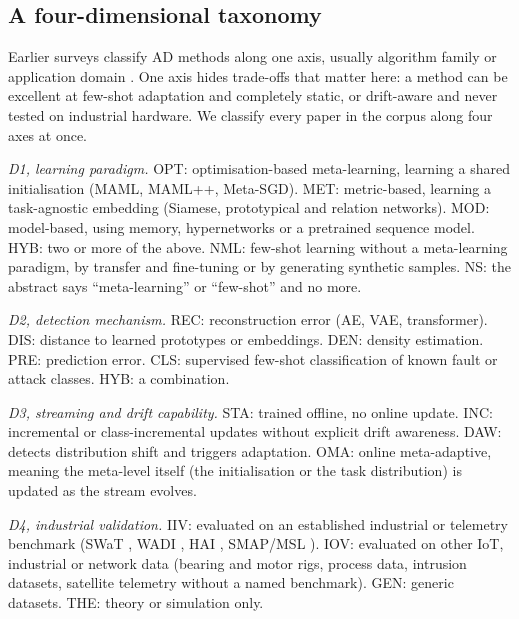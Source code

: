 \hypertarget{a-four-dimensional-taxonomy}{%
\subsection{A four-dimensional taxonomy}\label{a-four-dimensional-taxonomy}}

Earlier surveys classify AD methods along one axis, usually algorithm family \citep{chandola2009survey, pang2021deep} or application domain \citep{belay2023iot}. One axis hides trade-offs that matter here: a method can be excellent at few-shot adaptation and completely static, or drift-aware and never tested on industrial hardware. We classify every paper in the corpus along four axes at once.

\emph{D1, learning paradigm.} OPT: optimisation-based meta-learning, learning a shared initialisation (MAML, MAML++, Meta-SGD). MET: metric-based, learning a task-agnostic embedding (Siamese, prototypical and relation networks). MOD: model-based, using memory, hypernetworks or a pretrained sequence model. HYB: two or more of the above. NML: few-shot learning without a meta-learning paradigm, by transfer and fine-tuning or by generating synthetic samples. NS: the abstract says ``meta-learning'' or ``few-shot'' and no more.

\emph{D2, detection mechanism.} REC: reconstruction error (AE, VAE, transformer). DIS: distance to learned prototypes or embeddings. DEN: density estimation. PRE: prediction error. CLS: supervised few-shot classification of known fault or attack classes. HYB: a combination.

\emph{D3, streaming and drift capability.} STA: trained offline, no online update. INC: incremental or class-incremental updates without explicit drift awareness. DAW: detects distribution shift and triggers adaptation. OMA: online meta-adaptive, meaning the meta-level itself (the initialisation or the task distribution) is updated as the stream evolves.

\emph{D4, industrial validation.} IIV: evaluated on an established industrial or telemetry benchmark (SWaT \citep{goh2016swat}, WADI \citep{ahmed2017wadi}, HAI \citep{shin2021hai}, SMAP/MSL \citep{hundman2018smap}). IOV: evaluated on other IoT, industrial or network data (bearing and motor rigs, process data, intrusion datasets, satellite telemetry without a named benchmark). GEN: generic datasets. THE: theory or simulation only.

